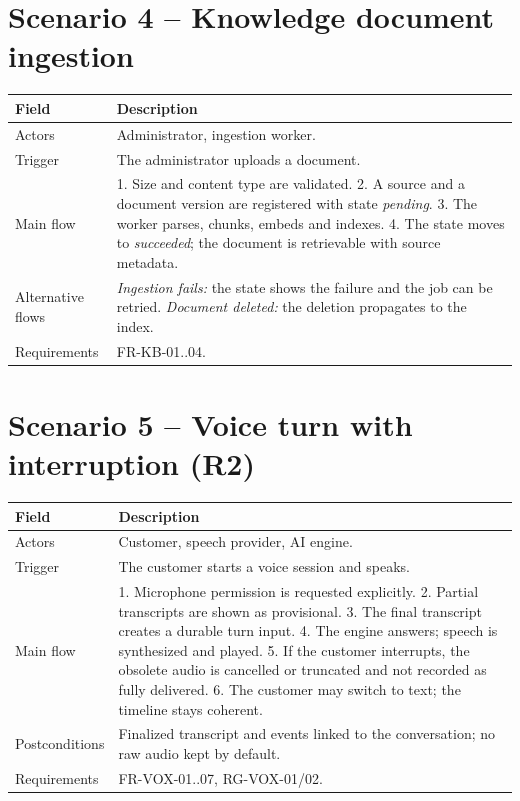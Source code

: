 \section{Scenario 4 -- Knowledge document ingestion}
\begin{tabular}{@{}p{3.2cm}p{12.8cm}@{}}
\toprule \textbf{Field} & \textbf{Description} \\ \midrule
Actors & Administrator, ingestion worker. \\
Trigger & The administrator uploads a document. \\
Main flow & 1. Size and content type are validated. 2. A source and a document version are registered with state \emph{pending}. 3. The worker parses, chunks, embeds and indexes. 4. The state moves to \emph{succeeded}; the document is retrievable with source metadata. \\
Alternative flows & \emph{Ingestion fails:} the state shows the failure and the job can be retried. \emph{Document deleted:} the deletion propagates to the index. \\
Requirements & FR-KB-01..04. \\
\bottomrule
\end{tabular}

\section{Scenario 5 -- Voice turn with interruption (R2)}
\begin{tabular}{@{}p{3.2cm}p{12.8cm}@{}}
\toprule \textbf{Field} & \textbf{Description} \\ \midrule
Actors & Customer, speech provider, AI engine. \\
Trigger & The customer starts a voice session and speaks. \\
Main flow & 1. Microphone permission is requested explicitly. 2. Partial transcripts are shown as provisional. 3. The final transcript creates a durable turn input. 4. The engine answers; speech is synthesized and played. 5. If the customer interrupts, the obsolete audio is cancelled or truncated and not recorded as fully delivered. 6. The customer may switch to text; the timeline stays coherent. \\
Postconditions & Finalized transcript and events linked to the conversation; no raw audio kept by default. \\
Requirements & FR-VOX-01..07, RG-VOX-01/02. \\
\bottomrule
\end{tabular}

